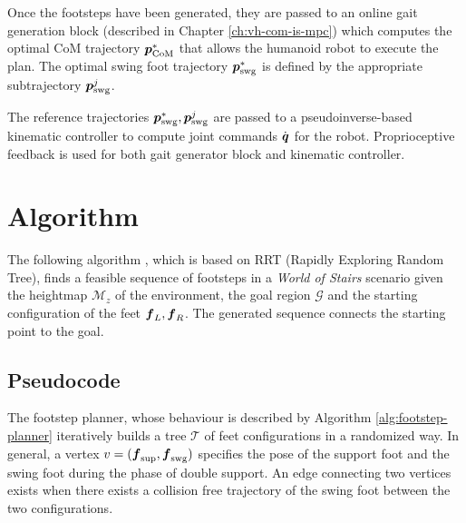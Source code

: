 Once the footsteps have been generated, they are passed to an online gait 
generation block (described in Chapter \ref{ch:vh-com-is-mpc}) which computes
the 
optimal CoM trajectory ${\mbox{\boldmath $p$}}_{\rm CoM}^*$ that allows the humanoid robot to
execute the plan. The optimal swing foot trajectory ${\mbox{\boldmath $p$}}_{\rm {swg}}^*$ is 
defined by the appropriate subtrajectory ${\mbox{\boldmath $p$}}_{\rm {swg}}^j$.

The reference trajectories ${\mbox{\boldmath $p$}}_{\rm {swg}}^*, {\mbox{\boldmath $p$}}_{\rm {swg}}^j$ are passed
to a pseudoinverse-based kinematic controller to compute joint commands
$\dot{{\mbox{\boldmath $q$}}}$ for the robot.
Proprioceptive feedback is used for both gait generator block 
and kinematic controller.

\section{Algorithm}
The following algorithm \cite{ECC19}, which is based on RRT (Rapidly Exploring
Random Tree), finds a feasible sequence of footsteps in a
\textit{World of Stairs} scenario given the heightmap $\mathcal{M}_z$ of the 
environment,
the goal region $\mathcal{G}$ and the starting configuration of the feet
${\mbox{\boldmath $f$}}_L, {\mbox{\boldmath $f$}}_R$. The generated sequence connects the starting point to the
goal.

\subsection{Pseudocode}
The footstep planner, whose behaviour is described by Algorithm
\ref{alg:footstep-planner} iteratively builds a tree $\mathcal{T}$ of feet 
configurations in a randomized way. In general, a vertex $v=({\mbox{\boldmath $f$}}_{\rm {sup}},
{\mbox{\boldmath $f$}}_{\rm {swg}})$ specifies the pose of the support foot and the swing foot 
during the phase of double support. An edge connecting two vertices exists 
when there exists a collision free trajectory of the swing foot between 
the two configurations.

